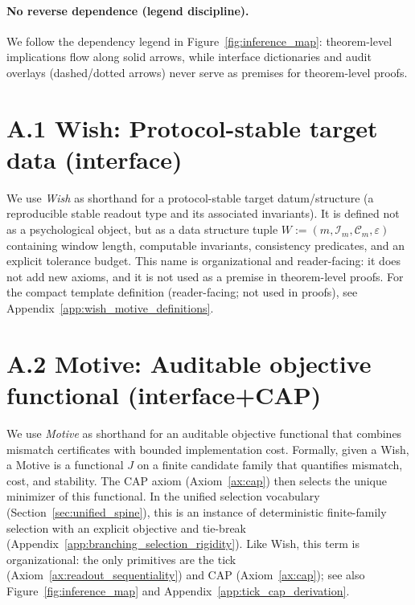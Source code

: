 \paragraph{No reverse dependence (legend discipline).}
\AuditTag We follow the dependency legend in Figure~\ref{fig:inference_map}: theorem-level implications flow along solid arrows, while interface dictionaries and audit overlays (dashed/dotted arrows) never serve as premises for theorem-level proofs.

\section*{A.1 Wish: Protocol-stable target data (interface)}

\InterfaceTag We use \emph{Wish} as shorthand for a protocol-stable target datum/structure (a reproducible stable readout type and its associated invariants).
It is defined not as a psychological object, but as a data structure tuple $W := (m, \mathcal{I}_m, \mathcal{C}_m, \varepsilon)$ containing window length, computable invariants, consistency predicates, and an explicit tolerance budget.
\AuditTag This name is organizational and reader-facing: it does not add new axioms, and it is not used as a premise in theorem-level proofs.
For the compact template definition (reader-facing; not used in proofs), see Appendix~\ref{app:wish_motive_definitions}.

\section*{A.2 Motive: Auditable objective functional (interface+CAP)}

\InterfaceTag We use \emph{Motive} as shorthand for an auditable objective functional that combines mismatch certificates with bounded implementation cost.
Formally, given a Wish, a Motive is a functional $J$ on a finite candidate family that quantifies mismatch, cost, and stability.
The CAP axiom (Axiom~\ref{ax:cap}) then selects the unique minimizer of this functional.
\AuditTag In the unified selection vocabulary (Section~\ref{sec:unified_spine}), this is an instance of deterministic finite-family selection with an explicit objective and tie-break (Appendix~\ref{app:branching_selection_rigidity}).
\AuditTag Like Wish, this term is organizational: the only primitives are the tick (Axiom~\ref{ax:readout_sequentiality}) and CAP (Axiom~\ref{ax:cap}); see also Figure~\ref{fig:inference_map} and Appendix~\ref{app:tick_cap_derivation}.

